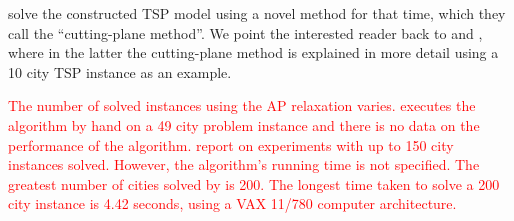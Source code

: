 \documentclass{mprop}
\theoremstyle{definition}
\begin{document}



\citet{Dantzig54} solve the constructed TSP model using a novel method for that time, which they call the ``cutting-plane method''. We point the interested reader back to \citep{Dantzig54} and \citep{Dantzig59}, where in the latter the cutting-plane method is explained in more detail using a 10 city TSP instance as an example.

\textcolor{red}{
The number of solved instances using the AP relaxation varies. \citet{Dantzig54} executes the algorithm by hand on a 49 city problem instance and there is no data on the performance of the algorithm. \citet{Jonker80} report on experiments with up to 150 city instances solved. However, the algorithm's running time is not specified. The greatest number of cities solved by \citet{Fischetti92} is 200. The longest time taken to solve a 200 city instance is 4.42 seconds, using a VAX 11/780 computer architecture.
}

\end{document}
